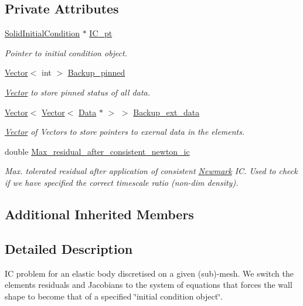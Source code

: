 \subsection*{Private Attributes}
\begin{DoxyCompactItemize}
\item 
\hyperlink{classoomph_1_1SolidInitialCondition}{Solid\+Initial\+Condition} $\ast$ \hyperlink{classoomph_1_1SolidICProblem_ac69ec7322cfe32c7c6a0a82a0ce0ff0d}{I\+C\+\_\+pt}
\begin{DoxyCompactList}\small\item\em Pointer to initial condition object. \end{DoxyCompactList}\item 
\hyperlink{classoomph_1_1Vector}{Vector}$<$ int $>$ \hyperlink{classoomph_1_1SolidICProblem_a75eca35ec7eeb8fa9b52dc074b9cb184}{Backup\+\_\+pinned}
\begin{DoxyCompactList}\small\item\em \hyperlink{classoomph_1_1Vector}{Vector} to store pinned status of all data. \end{DoxyCompactList}\item 
\hyperlink{classoomph_1_1Vector}{Vector}$<$ \hyperlink{classoomph_1_1Vector}{Vector}$<$ \hyperlink{classoomph_1_1Data}{Data} $\ast$ $>$ $>$ \hyperlink{classoomph_1_1SolidICProblem_a35520128294a9674f62e34750464863a}{Backup\+\_\+ext\+\_\+data}
\begin{DoxyCompactList}\small\item\em \hyperlink{classoomph_1_1Vector}{Vector} of Vectors to store pointers to exernal data in the elements. \end{DoxyCompactList}\item 
double \hyperlink{classoomph_1_1SolidICProblem_a8351e8422adab7110c7a2a41494b226b}{Max\+\_\+residual\+\_\+after\+\_\+consistent\+\_\+newton\+\_\+ic}
\begin{DoxyCompactList}\small\item\em Max. tolerated residual after application of consistent \hyperlink{classoomph_1_1Newmark}{Newmark} IC. Used to check if we have specified the correct timescale ratio (non-\/dim density). \end{DoxyCompactList}\end{DoxyCompactItemize}
\subsection*{Additional Inherited Members}


\subsection{Detailed Description}
IC problem for an elastic body discretised on a given (sub)-\/mesh. We switch the elements\textquotesingle{} residuals and Jacobians to the system of equations that forces the wall shape to become that of a specified \char`\"{}initial condition object\char`\"{}. 

